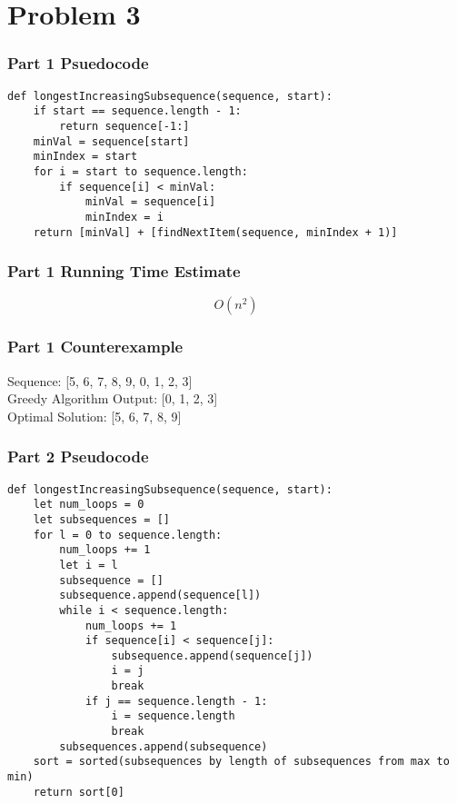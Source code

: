 \documentclass[letterpaper, 12pt]{math}
\begin{document}
\section*{Problem 3}

\subsubsection*{Part 1 Psuedocode}
\begin{lstlisting}
def longestIncreasingSubsequence(sequence, start):
    if start == sequence.length - 1:
        return sequence[-1:]
    minVal = sequence[start]
    minIndex = start
    for i = start to sequence.length:
        if sequence[i] < minVal:
            minVal = sequence[i]
            minIndex = i
    return [minVal] + [findNextItem(sequence, minIndex + 1)]
\end{lstlisting}

\subsubsection*{Part 1 Running Time Estimate}
\[ O(n^2) \]

\subsubsection*{Part 1 Counterexample}
Sequence: [5, 6, 7, 8, 9, 0, 1, 2, 3] \\
Greedy Algorithm Output: [0, 1, 2, 3] \\
Optimal Solution: [5, 6, 7, 8, 9]

\subsubsection*{Part 2 Pseudocode}
\begin{lstlisting}
def longestIncreasingSubsequence(sequence, start):
    let num_loops = 0
    let subsequences = []
    for l = 0 to sequence.length:
        num_loops += 1
        let i = l
        subsequence = []
        subsequence.append(sequence[l])
        while i < sequence.length:
            num_loops += 1
            if sequence[i] < sequence[j]:
                subsequence.append(sequence[j])
                i = j
                break
            if j == sequence.length - 1:
                i = sequence.length
                break
        subsequences.append(subsequence)
    sort = sorted(subsequences by length of subsequences from max to min)
    return sort[0]
\end{lstlisting}
\end{document}
